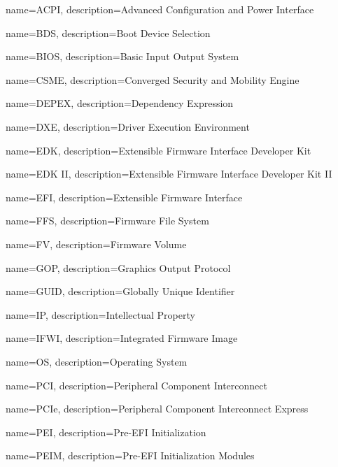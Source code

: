  {
	name=ACPI,
	description={Advanced Configuration and Power Interface
	}
}

 {
	name=BDS,
	description={Boot Device Selection
	}
}

 {
    name=BIOS,
    description={Basic Input Output System
    }
}


 {
    name=CSME,
    description={Converged Security and Mobility Engine
    }
}

 {
	name=DEPEX,
	description={Dependency Expression
	}
}


 {
	name=DXE,
	description={Driver Execution Environment
	}
}

 {
	name=EDK,
	description={Extensible Firmware Interface Developer Kit
	}
}

 {
	name={EDK II},
	description={Extensible Firmware Interface Developer Kit II
	}
}

 {
	name=EFI,
	description={Extensible Firmware Interface
	}
}

 {
    name=FFS,
    description={Firmware File System
    }
}

 {
    name=FV,
    description={Firmware Volume
    }
}

 {
    name=GOP,
    description={Graphics Output Protocol
    }
}

 {
    name=GUID,
    description={Globally Unique Identifier
    }
}

 {
    name=IP,
    description={Intellectual Property
    }
}

 {
    name=IFWI,
    description={Integrated Firmware Image
    }
}

 {
	name=OS,
	description={Operating System
	}
}

 {
	name=PCI,
	description={Peripheral Component Interconnect
	}
}

 {
	name=PCIe,
	description={Peripheral Component Interconnect Express
	}
}

 {
    name=PEI,
    description={Pre-EFI Initialization
    }
}

 {
    name=PEIM,
    description={Pre-EFI Initialization Modules
    }
}

